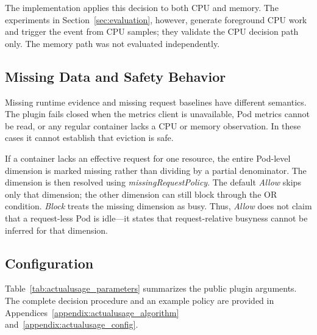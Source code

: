 The implementation applies this decision to both CPU and memory. The
experiments in Section~\ref{sec:evaluation}, however, generate foreground CPU
work and trigger the event from CPU samples; they validate the CPU decision
path only. The memory path was not evaluated independently.

\subsection{Missing Data and Safety Behavior}

Missing runtime evidence and missing request baselines have different
semantics. The plugin fails closed when the metrics client is unavailable,
Pod metrics cannot be read, or any regular container lacks a CPU or memory
observation. In these cases it cannot establish that eviction is safe.

If a container lacks an effective request for one resource, the entire
Pod-level dimension is marked missing rather than dividing by a partial
denominator. The dimension is then resolved using
\textit{missingRequestPolicy}. The default \textit{Allow} skips only that
dimension; the other dimension can still block through the OR condition.
\textit{Block} treats the missing dimension as busy. Thus, \textit{Allow} does
not claim that a request-less Pod is idle---it states that request-relative
busyness cannot be inferred for that dimension.

\subsection{Configuration}

Table~\ref{tab:actualusage_parameters} summarizes the public plugin arguments.
The complete decision procedure and an example policy are provided in
Appendices~\ref{appendix:actualusage_algorithm}
and~\ref{appendix:actualusage_config}.

